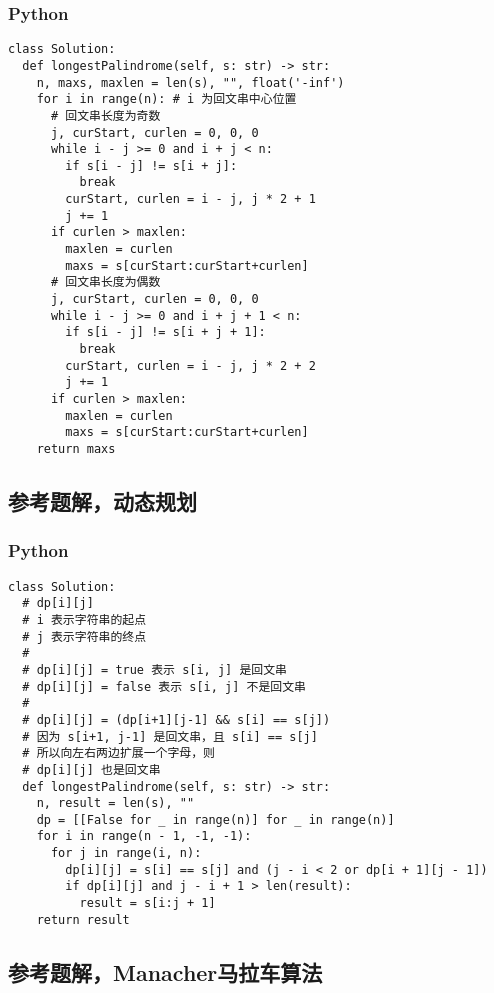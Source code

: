 \subsubsection{Python}

\begin{verbatim}
class Solution:
  def longestPalindrome(self, s: str) -> str:
    n, maxs, maxlen = len(s), "", float('-inf')
    for i in range(n): # i 为回文串中心位置
      # 回文串长度为奇数
      j, curStart, curlen = 0, 0, 0
      while i - j >= 0 and i + j < n:
        if s[i - j] != s[i + j]:
          break
        curStart, curlen = i - j, j * 2 + 1
        j += 1
      if curlen > maxlen:
        maxlen = curlen
        maxs = s[curStart:curStart+curlen]
      # 回文串长度为偶数
      j, curStart, curlen = 0, 0, 0
      while i - j >= 0 and i + j + 1 < n:
        if s[i - j] != s[i + j + 1]:
          break
        curStart, curlen = i - j, j * 2 + 2
        j += 1
      if curlen > maxlen:
        maxlen = curlen
        maxs = s[curStart:curStart+curlen]
    return maxs
\end{verbatim}

\subsection{参考题解，动态规划}

\subsubsection{Python}

\begin{verbatim}
class Solution:
  # dp[i][j]
  # i 表示字符串的起点
  # j 表示字符串的终点
  #
  # dp[i][j] = true 表示 s[i, j] 是回文串
  # dp[i][j] = false 表示 s[i, j] 不是回文串
  #
  # dp[i][j] = (dp[i+1][j-1] && s[i] == s[j])
  # 因为 s[i+1, j-1] 是回文串，且 s[i] == s[j]
  # 所以向左右两边扩展一个字母，则
  # dp[i][j] 也是回文串
  def longestPalindrome(self, s: str) -> str:
    n, result = len(s), ""
    dp = [[False for _ in range(n)] for _ in range(n)]
    for i in range(n - 1, -1, -1):
      for j in range(i, n):
        dp[i][j] = s[i] == s[j] and (j - i < 2 or dp[i + 1][j - 1])
        if dp[i][j] and j - i + 1 > len(result):
          result = s[i:j + 1]
    return result
\end{verbatim}

\subsection{参考题解，Manacher马拉车算法}

